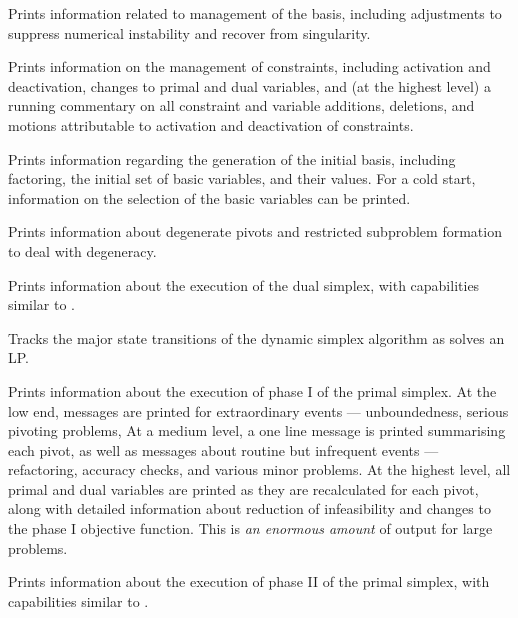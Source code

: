 \begin{codedoc}
  \item{}
  Prints information related to management of the basis, including adjustments
  to suppress numerical instability and recover from singularity.

  \item{}
  Prints information on the management of constraints, including activation and
  deactivation, changes to primal and dual variables, and (at the highest level)
  a running commentary on all constraint and variable additions, deletions, and
  motions attributable to activation and deactivation of constraints.

  \item{}
  Prints information regarding the generation of the initial basis,
  including factoring, the initial set of basic variables, and their values.
  For a cold start, information on the selection of the basic variables can be
  printed.

  \item{}
  Prints information about degenerate pivots and restricted
  subproblem formation to deal with degeneracy.

  \item{}
  Prints information about the execution of the dual simplex, with capabilities
  similar to .

  \item{}
  Tracks the major state transitions of the dynamic simplex algorithm
  as \dylp solves an LP.

  \item{}
  Prints information about the execution of phase I of the primal simplex.
  At the low end, messages are printed for extraordinary events ---
  unboundedness, serious pivoting problems, \etc
  At a medium level, a one line message is printed summarising each pivot, as
  well as messages about routine but infrequent events --- refactoring, accuracy
  checks, and various minor problems.
  At the highest level, all primal and dual variables are printed as they are
  recalculated for each pivot, along with detailed information about reduction
  of infeasibility and changes to the phase I objective function.
  This is \textit{an enormous amount} of output for large problems. 

  \item{}
  Prints information about the execution of phase II of the primal simplex,
  with capabilities similar to .


\end{codedoc}
